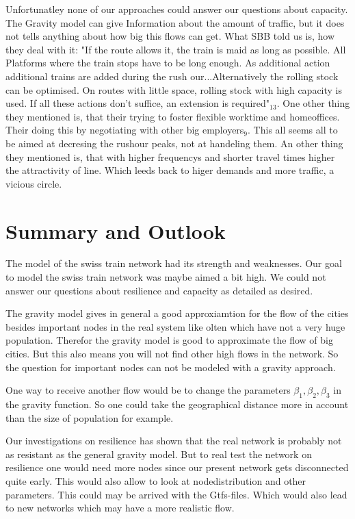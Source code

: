 \documentclass[11pt]{article}
\begin{document}
Unfortunatley none of our approaches could answer our questions about capacity. The Gravity model can give Information about the amount of traffic, but it does not tells anything about how big this flows can get. What SBB told us is, how they deal with it: "If the route allows it, the train is maid as long as possible. All Platforms where the train stops have to be long enough. As additional action additional trains are added during the rush our...Alternatively the rolling stock can be optimised. On routes with little space, rolling stock with high capacity is used. If all these actions don't suffice, an extension is required"$_{13}$. One other thing they mentioned is, that their trying to foster flexible worktime and homeoffices. Their doing this by negotiating with other big employers$_{9}$. This all seems all to be aimed at decresing the rushour peaks, not at handeling them. An other thing they mentioned is, that with higher frequencys and shorter travel times higher the attractivity of line. Which leeds back to higer demands and more traffic, a vicious circle.




\section{Summary and Outlook}

The model of the swiss train network had its strength and weaknesses. Our goal to model the swiss train network was maybe aimed a bit high. We could not answer our questions about resilience and capacity as detailed as desired. 

The gravity model gives in general a good approxiamtion for the flow of the cities besides important nodes in the real system like olten which have not a very huge population. Therefor the gravity model is good to approximate the flow of big cities. But this also means you will not find other high flows in the network. So the question for important nodes can not be modeled with a gravity approach.

One way to receive another flow would be to change the parameters $\beta_1,\beta_2,\beta_3$ in the gravity function. So one could take the geographical distance more in account than the size of population for example. \newline

Our investigations on resilience has shown that the real network is probably not as resistant as the general gravity model. But to real test the network on resilience one would need more nodes since our present network gets disconnected quite early. This would also allow to look at nodedistribution and other parameters. This could may be arrived with the Gtfs-files. Which would also lead to new networks which may have a more realistic flow.
\end{document}
